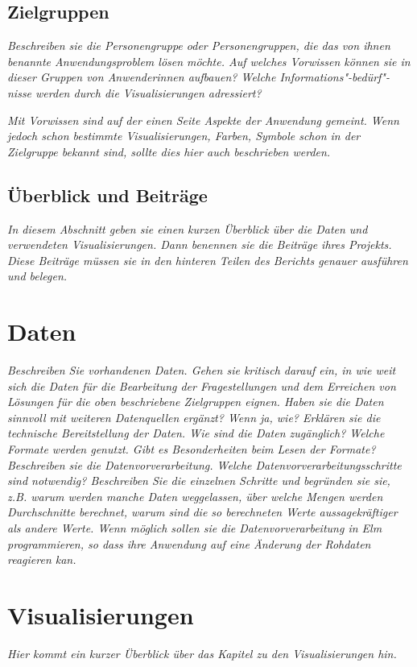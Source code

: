\documentclass[usegeometry=true]{scrartcl}
\begin{document}
\subsection{Zielgruppen}
\textit{Beschreiben sie die Personengruppe oder Personengruppen, die das von ihnen benannte Anwendungsproblem lösen möchte. Auf welches Vorwissen können sie in dieser Gruppen von Anwenderinnen aufbauen? Welche Informations"-bedürf"-nisse werden durch die Visualisierungen adressiert?
}

\textit{
Mit Vorwissen sind auf der einen Seite Aspekte der Anwendung gemeint. Wenn jedoch schon bestimmte Visualisierungen, Farben, Symbole schon in der Zielgruppe bekannt sind, sollte dies hier auch beschrieben werden.
}

\subsection{Überblick und Beiträge}
\textit{In diesem Abschnitt geben sie einen kurzen Überblick über die Daten und verwendeten Visualisierungen. Dann benennen sie die Beiträge ihres Projekts. Diese Beiträge müssen sie in den hinteren Teilen des Berichts genauer ausführen und belegen.
}

\section{Daten}
\textit{Beschreiben Sie vorhandenen Daten. Gehen sie kritisch darauf ein, in wie weit sich die Daten für die Bearbeitung der Fragestellungen und dem Erreichen von Lösungen für die oben beschriebene Zielgruppen eignen. Haben sie die Daten sinnvoll mit weiteren Datenquellen ergänzt? Wenn ja, wie?
Erklären sie die technische Bereitstellung der Daten.
Wie sind die Daten zugänglich? Welche Formate werden genutzt. Gibt es Besonderheiten beim Lesen der Formate?
Beschreiben sie die Datenvorverarbeitung.
Welche Datenvorverarbeitungsschritte sind notwendig? Beschreiben Sie die einzelnen Schritte und begründen sie sie, z.B. warum werden manche Daten weggelassen, über welche Mengen werden Durchschnitte berechnet, warum sind die so berechneten Werte aussagekräftiger als andere Werte. Wenn möglich sollen sie die Datenvorverarbeitung in Elm programmieren, so dass ihre Anwendung auf eine Änderung der Rohdaten reagieren kan. 
}

\section{Visualisierungen}
\textit{Hier kommt ein kurzer Überblick über das Kapitel zu den Visualisierungen hin.}
\end{document}
